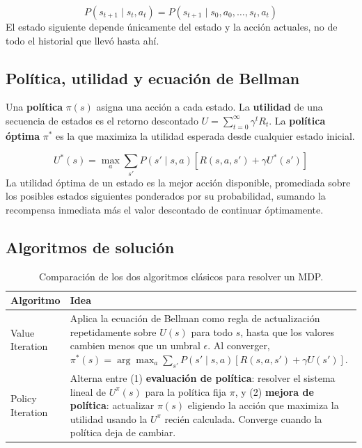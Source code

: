 \begin{definition}
    \[
        P(s_{t+1} \mid s_t, a_t) = P(s_{t+1} \mid s_0, a_0, \ldots, s_t, a_t)
    \]
    El estado siguiente depende únicamente del estado y la acción actuales, no de todo el historial que llevó hasta ahí.
\end{definition}

\subsection{Política, utilidad y ecuación de Bellman}

\begin{definition}
    Una \textbf{política} $\pi(s)$ asigna una acción a cada estado. La \textbf{utilidad} de una secuencia de estados es el
    retorno descontado $U = \sum_{t=0}^{\infty} \gamma^t R_t$. La \textbf{política óptima} $\pi^*$ es la que maximiza la
    utilidad esperada desde cualquier estado inicial.
\end{definition}

\begin{theorem}
    \[
        U^*(s) = \max_{a} \sum_{s'} P(s'\mid s,a)\left[R(s,a,s') + \gamma U^*(s')\right]
    \]
    La utilidad óptima de un estado es la mejor acción disponible, promediada sobre los posibles estados siguientes
    ponderados por su probabilidad, sumando la recompensa inmediata más el valor descontado de continuar óptimamente.
\end{theorem}


\subsection{Algoritmos de solución}

\begin{table}[H]
    \centering
    \begin{tabular}{lp{9cm}}
        \toprule
        Algoritmo & Idea \\
        \midrule
        Value Iteration & Aplica la ecuación de Bellman como regla de actualización repetidamente sobre $U(s)$ para todo
        $s$, hasta que los valores cambien menos que un umbral $\epsilon$. Al converger, $\pi^*(s) = \arg\max_a
        \sum_{s'} P(s'\mid s,a)[R(s,a,s') + \gamma U(s')]$. \\
        Policy Iteration & Alterna entre (1) \textbf{evaluación de política}: resolver el sistema lineal de $U^\pi(s)$
        para la política fija $\pi$, y (2) \textbf{mejora de política}: actualizar $\pi(s)$ eligiendo la acción que
        maximiza la utilidad usando la $U^\pi$ recién calculada. Converge cuando la política deja de cambiar. \\
        \bottomrule
    \end{tabular}
    \caption{Comparación de los dos algoritmos clásicos para resolver un MDP.}
\end{table}

